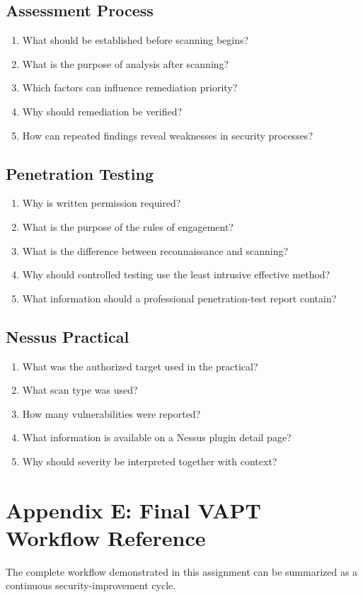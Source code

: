\documentclass[11pt,a4paper]{article}
\begin{document}
\subsection{Assessment Process}
\begin{enumerate}
\item What should be established before scanning begins?
\item What is the purpose of analysis after scanning?
\item Which factors can influence remediation priority?
\item Why should remediation be verified?
\item How can repeated findings reveal weaknesses in security processes?
\end{enumerate}

\subsection{Penetration Testing}
\begin{enumerate}
\item Why is written permission required?
\item What is the purpose of the rules of engagement?
\item What is the difference between reconnaissance and scanning?
\item Why should controlled testing use the least intrusive effective method?
\item What information should a professional penetration-test report contain?
\end{enumerate}

\subsection{Nessus Practical}
\begin{enumerate}
\item What was the authorized target used in the practical?
\item What scan type was used?
\item How many vulnerabilities were reported?
\item What information is available on a Nessus plugin detail page?
\item Why should severity be interpreted together with context?
\end{enumerate}

\newpage
\section{Appendix E: Final VAPT Workflow Reference}
The complete workflow demonstrated in this assignment can be summarized as a continuous security-improvement cycle.
\end{document}
